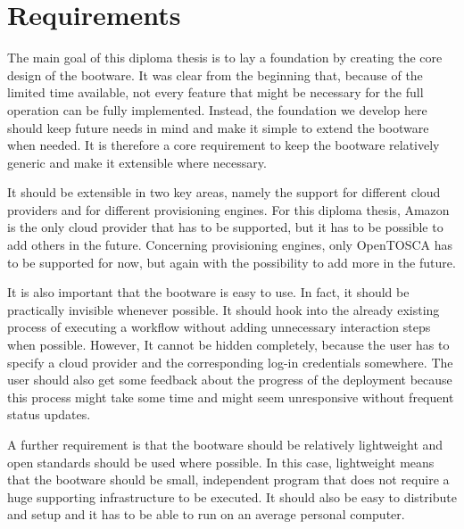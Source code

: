\section{Requirements}

The main goal of this diploma thesis is to lay a foundation by creating the core design of the bootware.
It was clear from the beginning that, because of the limited time available, not every feature that might be necessary for the full operation can be fully implemented.
Instead, the foundation we develop here should keep future needs in mind and make it simple to extend the bootware when needed.
It is therefore a core requirement to keep the bootware relatively generic and make it extensible where necessary.

It should be extensible in two key areas, namely the support for different cloud providers and for different provisioning engines.
For this diploma thesis, Amazon is the only cloud provider that has to be supported, but it has to be possible to add others in the future.
Concerning provisioning engines, only OpenTOSCA has to be supported for now, but again with the possibility to add more in the future.

It is also important that the bootware is easy to use.
In fact, it should be practically invisible whenever possible.
It should hook into the already existing process of executing a workflow without adding unnecessary interaction steps when possible.
However, It cannot be hidden completely, because the user has to specify a cloud provider and the corresponding log-in credentials somewhere.
The user should also get some feedback about the progress of the deployment because this process might take some time and might seem unresponsive without frequent status updates.

\pagebreak

A further requirement is that the bootware should be relatively lightweight and open standards should be used where possible.
In this case, lightweight means that the bootware should be small, independent program that does not require a huge supporting infrastructure to be executed.
It should also be easy to distribute and setup and it has to be able to run on an average personal computer.
